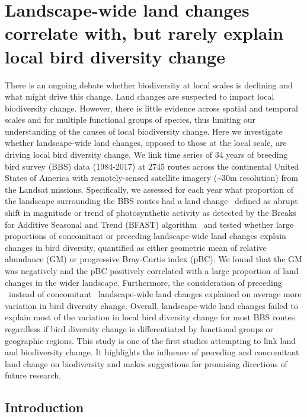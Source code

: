 \chapter{Landscape-wide land changes correlate with, but rarely explain local bird diversity change}
\label{C05}

There is an ongoing debate whether biodiversity at local scales is declining and what might drive this change. Land changes are suspected to impact local biodiversity change. However, there is little evidence across spatial and temporal scales and for multiple functional groups of species, thus limiting our understanding of the causes of local biodiversity change. Here we investigate whether landscape-wide land changes, opposed to those at the local scale, are driving local bird diversity change. We link time series of 34 years of breeding bird survey (BBS) data (1984-2017) at 2745 routes across the continental United States of America with remotely-sensed satellite imagery (\textasciitilde30m resolution) from the Landsat missions. Specifically, we assessed for each year what proportion of the landscape surrounding the BBS routes had a land change \textendash\ defined as abrupt shift in magnitude or trend of photosynthetic activity as detected by the Breaks for Additive Seasonal and Trend (BFAST) algorithm \textendash\ and tested whether large proportions of concomitant or preceding landscape-wide land changes explain changes in bird diversity, quantified as either geometric mean of relative abundance (GM) or progressive Bray-Curtis index (pBC). We found that the GM was negatively and the pBC positively correlated with a large proportion of land changes in the wider landscape. Furthermore, the consideration of preceding \textendash\ instead of concomitant \textendash\ landscape-wide land changes explained on average more variation in bird diversity change. Overall, landscape-wide land changes failed to explain most of the variation in local bird diversity change for most BBS routes regardless if bird diversity change is differentiated by functional groups or geographic regions. This study is one of the first studies attempting to link land and biodiversity change. It highlights the influence of preceding and concomitant land change on biodiversity and makes suggestions for promising directions of future research.  

\section{Introduction}
\label{C05_01}

